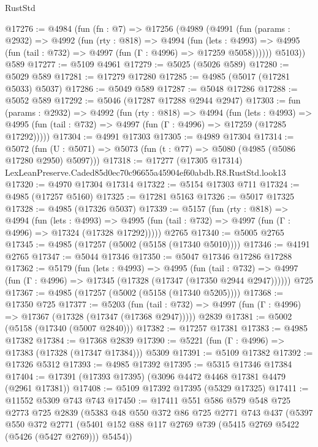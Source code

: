 \begin{lexlean}{RustStd}
\begin{coremodule}
@17276 := @4984
    (fun (fn : @7) =>
    @17256
      (@4989
        (@4991
          (fun (params : @2932) =>
          @4992
            (fun (rty : @818) =>
            @4994
              (fun (lets : @4993) =>
              @4995 (fun (tail : @732) => @4997 (fun (Γ : @4996) => @17259 @5058))))))
        @5103))
    @589
@17277 := @5109 @4961
@17279 := @5025 (@5026 @589)
@17280 := @5029 @589
@17281 := @17279 @17280
@17285 := @4985 (@5017 (@17281 @5033) @5037)
@17286 := @5049 @589
@17287 := @5048 @17286
@17288 := @5052 @589
@17292 := @5046 (@17287 @17288 @2944 @2947)
@17303 := fun (params : @2932) =>
  @4992
    (fun (rty : @818) =>
    @4994
      (fun (lets : @4993) =>
      @4995 (fun (tail : @732) => @4997 (fun (Γ : @4996) => @17259 (@17285 @17292)))))
@17304 := @4991 @17303
@17305 := @4989 @17304
@17314 := @5072
    (fun (U : @5071) => @5073 (fun (t : @77) => @5080 (@4985 (@5086 @17280 @2950) @5097)))
@17318 := @17277 (@17305 @17314) LexLeanPreserve.Caded85d0ec70c96655a45904ef60abdb.R8.RustStd.look13
@17320 := @4970 @17304 @17314
@17322 := @5154 @17303 @711
@17324 := @4985 (@17257 @5160)
@17325 := @17281 @5163
@17326 := @5017 @17325
@17328 := @4985 (@17326 @5037)
@17339 := @5157
    (fun (rty : @818) =>
    @4994
      (fun (lets : @4993) =>
      @4995 (fun (tail : @732) => @4997 (fun (Γ : @4996) => @17324 (@17328 @17292)))))
    @2765
@17340 := @5005 @2765
@17345 := @4985 (@17257 (@5002 (@5158 (@17340 @5010))))
@17346 := @4191 @2765
@17347 := @5044 @17346
@17350 := @5047 @17346 @17286 @17288
@17362 := @5179
    (fun (lets : @4993) =>
    @4995
      (fun (tail : @732) =>
      @4997 (fun (Γ : @4996) => @17345 (@17328 (@17347 (@17350 @2944 @2947))))))
    @725
@17367 := @4985 (@17257 (@5002 (@5158 (@17340 @5205))))
@17368 := @17350 @725
@17377 := @5203
    (fun (tail : @732) => @4997 (fun (Γ : @4996) => @17367 (@17328 (@17347 (@17368 @2947)))))
    @2839
@17381 := @5002 (@5158 (@17340 (@5007 @2840)))
@17382 := @17257 @17381
@17383 := @4985 @17382
@17384 := @17368 @2839
@17390 := @5221 (fun (Γ : @4996) => @17383 (@17328 (@17347 @17384))) @5309
@17391 := @5109 @17382
@17392 := @17326 @5312
@17393 := @4985 @17392
@17395 := @5315 @17346 @17384
@17404 := @17391 (@17393 @17395) (@3096 @4472 @4468 @17381 @4479 (@2961 @17381))
@17408 := @5109 @17392 @17395 (@5329 @17325)
@17411 := @11552 @5309 @743 @743
@17450 := @17411
    @551
    @586
    @579
    @548
    @725
    @2773
    @725
    @2839
    (@5383
      @48
      @550
      @372
      @86
      @725
      @2771
      @743
      @437
      (@5397
        @550
        @372
        @2771
        (@5401 @152 @88 @117 @2769 @739 (@5415 @2769 @5422 (@5426 (@5427 @2769))) @5454))

\end{coremodule}
\end{lexlean}
